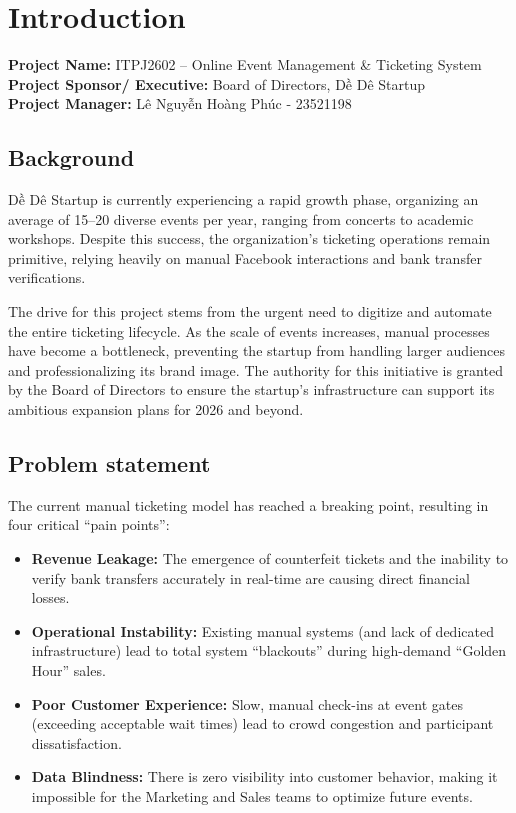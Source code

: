 \chapter{Introduction}

\textbf{Project Name:} ITPJ2602 – Online Event Management \& Ticketing System \\
\textbf{Project Sponsor/ Executive:} Board of Directors, Dề Dê Startup \\
\textbf{Project Manager:} Lê Nguyễn Hoàng Phúc - 23521198

\section{Background}

Dề Dê Startup is currently experiencing a rapid growth phase, organizing an average of 15–20 diverse events per year, ranging from concerts to academic workshops. Despite this success, the organization’s ticketing operations remain primitive, relying heavily on manual Facebook interactions and bank transfer verifications.

The drive for this project stems from the urgent need to digitize and automate the entire ticketing lifecycle. As the scale of events increases, manual processes have become a bottleneck, preventing the startup from handling larger audiences and professionalizing its brand image. The authority for this initiative is granted by the Board of Directors to ensure the startup's infrastructure can support its ambitious expansion plans for 2026 and beyond.

\section{Problem statement}

The current manual ticketing model has reached a breaking point, resulting in four critical ``pain points'':
\begin{itemize}
    \item \textbf{Revenue Leakage:} The emergence of counterfeit tickets and the inability to verify bank transfers accurately in real-time are causing direct financial losses.
    \item \textbf{Operational Instability:} Existing manual systems (and lack of dedicated infrastructure) lead to total system ``blackouts'' during high-demand ``Golden Hour'' sales.
    \item \textbf{Poor Customer Experience:} Slow, manual check-ins at event gates (exceeding acceptable wait times) lead to crowd congestion and participant dissatisfaction.
    \item \textbf{Data Blindness:} There is zero visibility into customer behavior, making it impossible for the Marketing and Sales teams to optimize future events.
\end{itemize}


